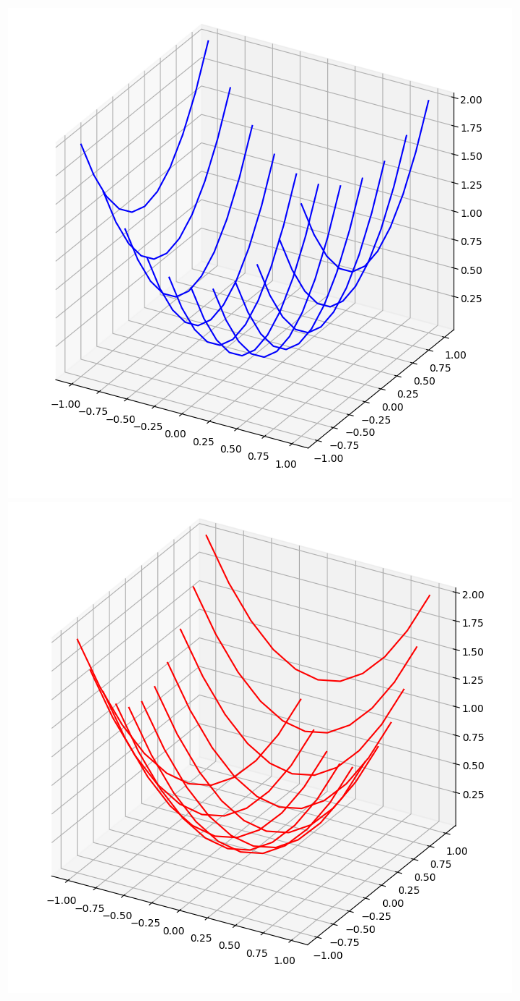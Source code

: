 \documentclass[11pt,class=report,crop=false]{standalone}
\begin{document}
\begin{activite}[Surfaces]
\begin{enumerate}
\begin{enumerate}
	  \begin{center}
	  	\includegraphics[scale=\myscale,scale=0.21]{ecran-surface-7}
	  	\includegraphics[scale=\myscale,scale=0.21]{ecran-surface-8}

\end{center}
\end{enumerate}
\end{enumerate}
\end{activite}
\end{document}
